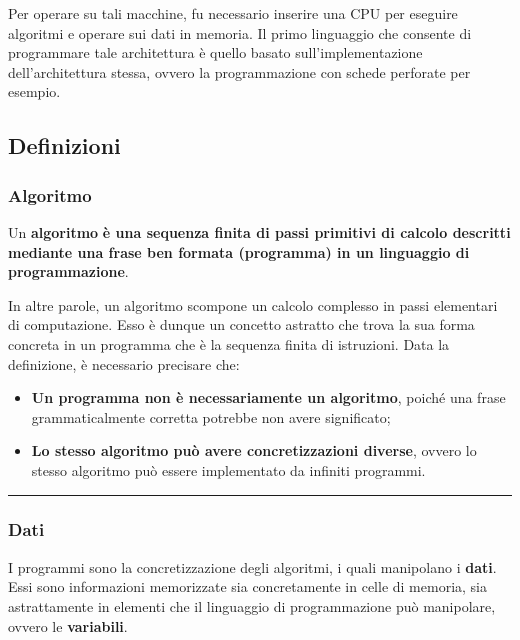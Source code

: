 \documentclass[a4paper]{article}
\newcommand{\longline}{\noindent\rule{\textwidth}{0.4pt}}
\begin{document}
	\noindent
	Per operare su tali macchine, fu necessario inserire una CPU per eseguire algoritmi e operare sui dati in memoria. Il primo linguaggio che consente di programmare tale architettura è quello basato sull'implementazione dell'architettura stessa, ovvero la programmazione con schede perforate per esempio.\newpage
	
	\subsection{Definizioni}
	
	\subsubsection{Algoritmo}
	
	\begin{boxdef}
		Un \textcolor{Red3}{\textbf{algoritmo}} \textbf{è una sequenza finita di passi primitivi di calcolo descritti mediante una frase ben formata (programma) in un linguaggio di programmazione}.
	\end{boxdef}

	\noindent
	In altre parole, un algoritmo scompone un calcolo complesso in passi elementari di computazione. Esso è dunque un concetto astratto che trova la sua forma concreta in un programma che è la sequenza finita di istruzioni.\newline
	Data la definizione, è necessario precisare che:
	\begin{itemize}
		\item \textbf{Un programma non è necessariamente un algoritmo}, poiché una frase grammaticalmente corretta potrebbe non avere significato;
		\item \textbf{Lo stesso algoritmo può avere concretizzazioni diverse}, ovvero lo stesso algoritmo può essere implementato da infiniti programmi.
	\end{itemize}

	\longline

	\subsubsection{Dati}

	I programmi sono la concretizzazione degli algoritmi, i quali manipolano i \textcolor{Red3}{\textbf{dati}}. Essi sono informazioni memorizzate sia concretamente in celle di memoria, sia astrattamente in elementi che il linguaggio di programmazione può manipolare, ovvero le \textbf{variabili}.
	
\end{document}
